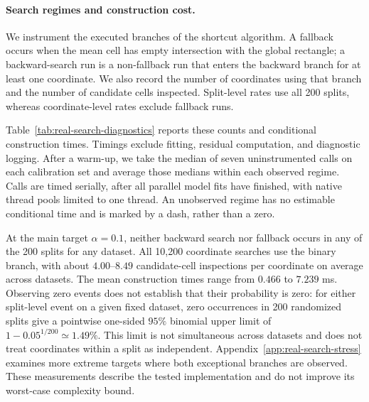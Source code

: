 \paragraph{Search regimes and construction cost.}
We instrument the executed branches of the shortcut algorithm. A fallback
occurs when the mean cell has empty intersection with the global rectangle;
a backward-search run is a non-fallback run that enters the backward branch
for at least one coordinate. We also record the number of coordinates using
that branch and the number of candidate cells inspected. Split-level rates
use all 200 splits, whereas coordinate-level rates exclude fallback runs.

Table~\ref{tab:real-search-diagnostics} reports these counts and conditional
construction times. Timings exclude fitting, residual computation, and
diagnostic logging. After a warm-up, we take the median of seven
uninstrumented calls on each calibration set and average those medians
within each observed regime. Calls are timed serially, after all parallel
model fits have finished, with native thread pools limited to one thread.
An unobserved regime has no estimable conditional time and is marked by a
dash, rather than a zero.

At the main target $\alpha=0.1$, neither backward search nor fallback occurs
in any of the 200 splits for any dataset. All 10,200 coordinate searches use
the binary branch, with about $4.00$--$8.49$ candidate-cell inspections per
coordinate on average across datasets. The mean construction times range
from $0.466$ to $7.239$ ms. Observing zero events does not establish that
their probability is zero: for either split-level event on a given fixed
dataset, zero occurrences in 200 randomized splits give a pointwise
one-sided $95\%$ binomial upper limit of
$1-0.05^{1/200}\simeq1.49\%$. This limit is not simultaneous across
datasets and does not treat coordinates within a split as independent.
Appendix~\ref{app:real-search-stress} examines more extreme targets where
both exceptional branches are observed. These measurements describe the
tested implementation and do not improve its worst-case complexity bound.

\begin{table}[!htbp]
  \centering
  \scriptsize
  \setlength{\tabcolsep}{3pt}
  
  \caption{Executed TSCP search regimes at target coverage $0.9$ in the new
  real-data reruns. Each split-count denominator is 200. The coordinate
  denominator is $d$ times the number of non-fallback splits. Conditional
  times summarize the full TSCP call, not just the backward loop; a dash
  denotes an unobserved regime. $n$ is the calibration size.}
  \label{tab:real-search-diagnostics}
\end{table}

